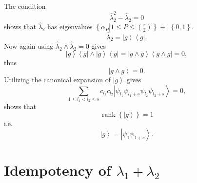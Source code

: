 \documentclass[aps,preprint]{revtex4}%
\begin{document}
The condition%
\begin{equation}
\hat{\lambda}_{2}^{2}-\hat{\lambda}_{2}=0
\end{equation}
shows that $\hat{\lambda}_{2}$ has eigenvalues $\left\{  \alpha_{P}\left\vert
1\leq P\leq\binom{r}{2}\right.  \right\}  \equiv$ $\left\{  0,1\right\}  $.
\begin{equation}
\hat{\lambda}_{2}=\left\vert g\right\rangle \left\langle g\right\vert .
\end{equation}
Now again using $\hat{\lambda}_{2}\wedge\hat{\lambda}_{2}=0$ gives
\begin{equation}
\left\vert g\right\rangle \left\langle g\right\vert \wedge\left\vert
g\right\rangle \left\langle g\right\vert =\left\vert g\wedge g\right\rangle
\left\langle g\wedge g\right\vert =0,
\end{equation}
thus
\begin{equation}
\left\vert g\wedge g\right\rangle =0.
\end{equation}
Utilizing the canonical expansion of $\left\vert g\right\rangle $ gives
\begin{equation}
\sum_{1\leq l_{1}<l_{2}\leq s}c_{l_{1}}c_{l_{2}}\left\vert \psi_{l_{1}}%
\psi_{l_{1}+s}\psi_{l_{2}}\psi_{l_{2}+s}\right\rangle =0,
\end{equation}
shows that
\begin{equation}
\operatorname*{rank}\left\{  \left\vert g\right\rangle \right\}  =1
\end{equation}
i.e.
\begin{equation}
\left\vert g\right\rangle =\left\vert \psi_{1}\psi_{1+s}\right\rangle .
\end{equation}


\section{Idempotency of $\lambda_{1}+\lambda_{2}$}
\end{document}
